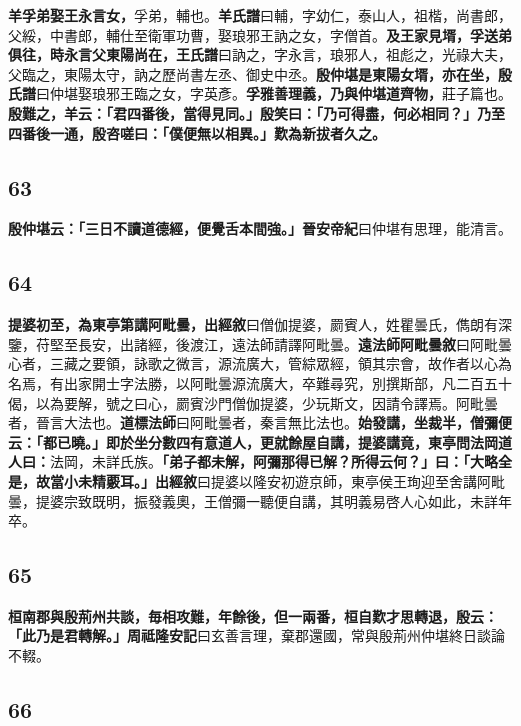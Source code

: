 \textbf{羊孚弟娶王永言女，}{\footnotesize 孚弟，輔也。\textbf{羊氏譜}曰輔，字幼仁，泰山人，祖楷，尚書郎，父綏，中書郎，輔仕至衛軍功曹，娶琅邪王訥之女，字僧首。}\textbf{及王家見壻，孚送弟俱往，時永言父東陽尚在，}{\footnotesize \textbf{王氏譜}曰訥之，字永言，琅邪人，祖彪之，光祿大夫，父臨之，東陽太守，訥之歷尚書左丞、御史中丞。}\textbf{殷仲堪是東陽女壻，亦在坐，}{\footnotesize \textbf{殷氏譜}曰仲堪娶琅邪王臨之女，字英彥。}\textbf{孚雅善理義，乃與仲堪道齊物，}{\footnotesize 莊子篇也。}\textbf{殷難之，羊云：「君四番後，當得見同。」殷笑曰：「乃可得盡，何必相同？」乃至四番後一通，殷咨嗟曰：「僕便無以相異。」歎為新拔者久之。}

\subsection*{63}

\textbf{殷仲堪云：「三日不讀道德經，便覺舌本間強。」}{\footnotesize \textbf{晉安帝紀}曰仲堪有思理，能清言。}

\subsection*{64}

\textbf{提婆初至，為東亭第講阿毗曇，}{\footnotesize \textbf{出經敘}曰僧伽提婆，罽賓人，姓瞿曇氏，儁朗有深鑒，苻堅至長安，出諸經，後渡江，遠法師請譯阿毗曇。\textbf{遠法師阿毗曇敘}曰阿毗曇心者，三藏之要領，詠歌之微言，源流廣大，管綜眾經，領其宗會，故作者以心為名焉，有出家開士字法勝，以阿毗曇源流廣大，卒難尋究，別撰斯部，凡二百五十偈，以為要解，號之曰心，罽賓沙門僧伽提婆，少玩斯文，因請令譯焉。阿毗曇者，晉言大法也。\textbf{道標法師}曰阿毗曇者，秦言無比法也。}\textbf{始發講，坐裁半，僧彌便云：「都已曉。」即於坐分數四有意道人，更就餘屋自講，提婆講竟，東亭問法岡道人曰：}{\footnotesize 法岡，未詳氏族。}\textbf{「弟子都未解，阿彌那得已解？所得云何？」曰：「大略全是，故當小未精覈耳。」}{\footnotesize \textbf{出經敘}曰提婆以隆安初遊京師，東亭侯王珣迎至舍講阿毗曇，提婆宗致既明，振發義奧，王僧彌一聽便自講，其明義易啓人心如此，未詳年卒。}

\subsection*{65}

\textbf{桓南郡與殷荊州共談，毎相攻難，年餘後，但一兩番，桓自歎才思轉退，殷云：「此乃是君轉解。」}{\footnotesize \textbf{周祗隆安記}曰玄善言理，棄郡還國，常與殷荊州仲堪終日談論不輟。}

\subsection*{66}

